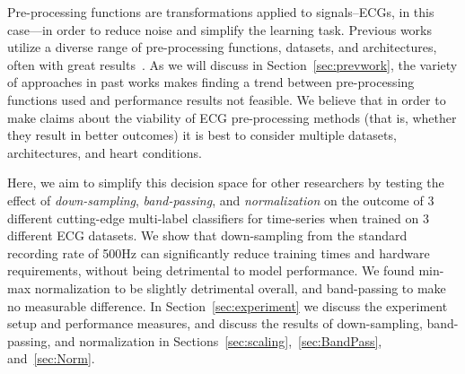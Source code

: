 \documentclass[pmlr,twocolumn]{jmlr}%
\begin{document}
 Pre-processing functions are transformations applied to signals--ECGs, in this case---in order to reduce noise and simplify the learning task. Previous works utilize a diverse range of pre-processing functions, datasets, and architectures, often with great results~\citep{hong2022practical}. As we will discuss in Section~\ref{sec:prevwork}, the variety of approaches in past works makes finding a trend between pre-processing functions used and performance results not feasible. We believe that in order to make claims about the viability of ECG pre-processing methods (that is, whether they result in better outcomes) it is best to consider multiple datasets, architectures, and heart conditions.  


Here, we aim to simplify this decision space for other researchers by testing the effect of \textit{down-sampling}, \textit{band-passing}, and \textit{normalization} on the outcome of 3 different cutting-edge multi-label classifiers for time-series when trained on 3 different ECG datasets. We show that down-sampling from the standard recording rate of 500Hz can significantly reduce training times and hardware requirements, without being detrimental to model performance.  We found min-max normalization to be slightly detrimental overall, and band-passing to make no measurable difference. In Section~\ref{sec:experiment} we discuss the experiment setup and performance measures, and discuss the results of down-sampling, band-passing, and normalization in Sections~\ref{sec:scaling},~\ref{sec:BandPass}, and~\ref{sec:Norm}. 


\begin{table}[htbp]
\label{tab:top5}
{\caption{Functions used by Top 5 teams in Physionet2020~\citep{hong2022practical}}}%
    
    { 
}
\end{table}
\end{document}

